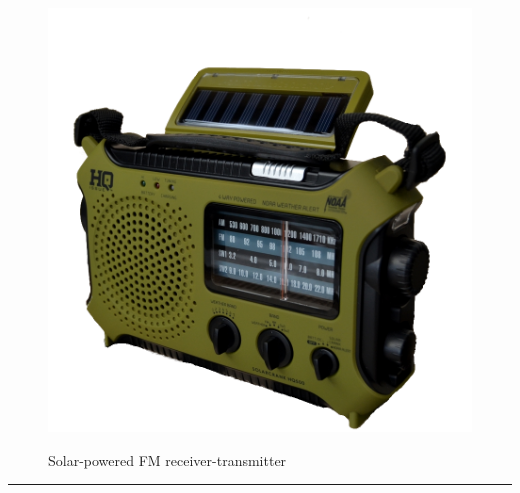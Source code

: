\documentclass{article}
\begin{document}
    \begin{figure}[H]
        \centering
        \begin{minipage}{0.25\textwidth}
            \centering
            \includegraphics[width=\textwidth]{../SurvivalItemImages/transmitter}
        \end{minipage}\hfill
        \begin{minipage}{0.7\textwidth}
            \centering
            \Large Solar-powered FM receiver-transmitter
        \end{minipage}
    \end{figure}
    \vspace{-0.8em}
    \noindent\rule{\textwidth}{0.4pt}
            
    \clearpage
\end{document}
